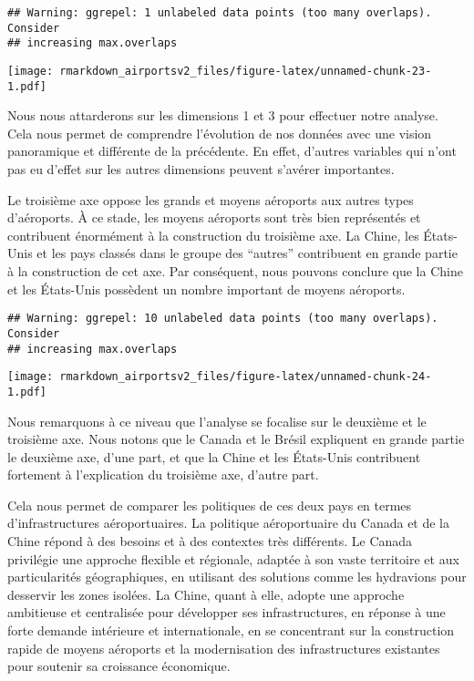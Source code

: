 \documentclass[
]{compterendu}
\begin{document}
\begin{verbatim}
## Warning: ggrepel: 1 unlabeled data points (too many overlaps). Consider
## increasing max.overlaps
\end{verbatim}

\texttt{[image: rmarkdown\_airportsv2\_files/figure-latex/unnamed-chunk-23-1.pdf]}

Nous nous attarderons sur les dimensions 1 et 3 pour effectuer notre
analyse. Cela nous permet de comprendre l'évolution de nos données avec
une vision panoramique et différente de la précédente. En effet,
d'autres variables qui n'ont pas eu d'effet sur les autres dimensions
peuvent s'avérer importantes.

Le troisième axe oppose les grands et moyens aéroports aux autres types
d'aéroports. À ce stade, les moyens aéroports sont très bien représentés
et contribuent énormément à la construction du troisième axe. La Chine,
les États-Unis et les pays classés dans le groupe des ``autres''
contribuent en grande partie à la construction de cet axe. Par
conséquent, nous pouvons conclure que la Chine et les États-Unis
possèdent un nombre important de moyens aéroports.

\begin{verbatim}
## Warning: ggrepel: 10 unlabeled data points (too many overlaps). Consider
## increasing max.overlaps
\end{verbatim}

\texttt{[image: rmarkdown\_airportsv2\_files/figure-latex/unnamed-chunk-24-1.pdf]}

Nous remarquons à ce niveau que l'analyse se focalise sur le deuxième et
le troisième axe. Nous notons que le Canada et le Brésil expliquent en
grande partie le deuxième axe, d'une part, et que la Chine et les
États-Unis contribuent fortement à l'explication du troisième axe,
d'autre part.

Cela nous permet de comparer les politiques de ces deux pays en termes
d'infrastructures aéroportuaires. La politique aéroportuaire du Canada
et de la Chine répond à des besoins et à des contextes très différents.
Le Canada privilégie une approche flexible et régionale, adaptée à son
vaste territoire et aux particularités géographiques, en utilisant des
solutions comme les hydravions pour desservir les zones isolées. La
Chine, quant à elle, adopte une approche ambitieuse et centralisée pour
développer ses infrastructures, en réponse à une forte demande
intérieure et internationale, en se concentrant sur la construction
rapide de moyens aéroports et la modernisation des infrastructures
existantes pour soutenir sa croissance économique.
\end{document}
